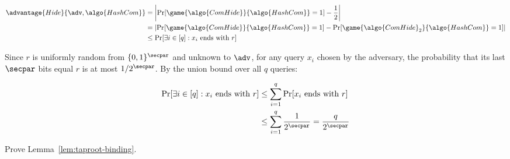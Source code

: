 \begin{mysolution}
\begin{align*}
  \advantage{Hide}{\adv, \algo{HashCom}} &= \left|\Pr[\game{\algo{ComHide}}{\algo{HashCom}} = 1] - \frac{1}{2}\right| \\
  &= \left|\Pr[\game{\algo{ComHide}}{\algo{HashCom}} = 1] - \Pr[\game{\algo{ComHide}_2}{\algo{HashCom}} = 1]\right| \\
  &\leq \Pr[\exists i \in [q] : x_i \text{ ends with } r]
\end{align*}

Since $r$ is uniformly random from $\{0,1\}^\secpar$ and unknown to $\adv$, for any query $x_i$ chosen by the adversary, the probability that its last $\secpar$ bits equal $r$ is at most $1/2^\secpar$.
By the union bound over all $q$ queries:

\begin{align*}
  \Pr[\exists i \in [q] : x_i \text{ ends with } r] &\leq \sum_{i=1}^q \Pr[x_i \text{ ends with } r] \\
  &\leq \sum_{i=1}^q \frac{1}{2^\secpar} = \frac{q}{2^\secpar}
\end{align*}
\end{mysolution}
\fi

\begin{exercise}\label{ex:taproot-binding}
  Prove Lemma~\ref{lem:taproot-binding}.
\end{exercise}

